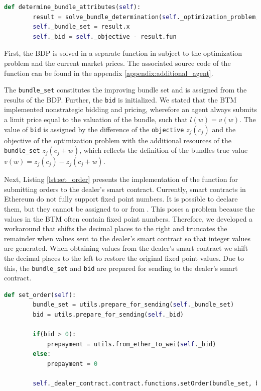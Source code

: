 \begin{lstlisting}[label=lst:determine_bundle, caption=Determining of bundle attributes, language=Python]
    def determine_bundle_attributes(self):
        result = solve_bundle_determination(self._optimization_problem, self._mkt_prices)
        self._bundle_set = result.x
        self._bid = self._objective - result.fun
\end{lstlisting}

First, the BDP is solved in a separate function in subject to the optimization problem and the current market prices.
The associated source code of the function can be found in the appendix \ref{appendix:additional_agent}.

The \verb|bundle_set| constitutes the improving bundle set and is assigned from the results of the BDP.
Further, the \verb|bid| is initialized. We stated that the BTM implemented nonstrategic bidding and pricing,
wherefore an agent always submits a limit price equal to the valuation of the bundle, such that $l(w) = v(w)$.
The value of \verb|bid| is assigned by the difference of the \verb|objective| $z_{j}(c_{j})$ and the 
objective of the optimization problem with the additional resources of the \verb|bundle_set| $z_{j}(c_{j}+w)$, 
which reflects the definition of the bundles true value $v(w) = z_{j}(c_{j}) - z_{j}(c_{j}+w)$.

Next, Listing \ref{lst:set_order} presents the implementation of the function for 
submitting orders to the dealer's smart contract.
Currently, smart contracts in Ethereum do not fully 
support fixed point numbers. It is possible to declare them, but they cannot be assigned to or from .
This poses a problem because the values in the BTM often contain fixed point numbers. Therefore, 
we developed a workaround that shifts the decimal places to the right and truncates
the remainder when values sent to the dealer's smart contract so that integer values are generated.
When obtaining values from the dealer's smart contract we shift the decimal places to the left to restore 
the original fixed point values. 
Due to this, the \verb|bundle_set| and \verb|bid| are prepared for 
sending to the dealer's smart contract.

\begin{lstlisting}[float=htbp, label=lst:set_order, caption=Submitting of order, language=Python]
    def set_order(self):
        bundle_set = utils.prepare_for_sending(self._bundle_set)
        bid = utils.prepare_for_sending(self._bid)
        
        if(bid > 0):
            prepayment = utils.from_ether_to_wei(self._bid)
        else:
            prepayment = 0

        self._dealer_contract.contract.functions.setOrder(bundle_set, bid, prepayment).transact({'from': self._account_address, 'value': prepayment})
\end{lstlisting}


